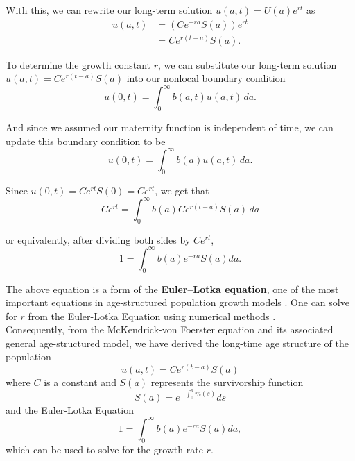 With this, we can rewrite our long-term solution $u(a, t) = U(a)e^{rt}$ as
\begin{align*} u(a, t) &= \left(Ce^{-ra}S(a)\right)e^{rt} \\
&= Ce^{r(t-a)} S(a).\end{align*}

To determine the growth constant $r$, we can substitute our long-term solution $u(a, t) = Ce^{r(t-a)}S(a)$ into our nonlocal boundary condition 
\[ u(0, t) = \int_0^{\infty} b(a, t) u(a, t) \, da.\]

And since we assumed our maternity function is independent of time, we can update this boundary condition to be 
\[ u(0, t) = \int_0^{\infty} b(a) u(a, t) \, da.\]


Since $u(0, t) = Ce^{rt}S(0) = Ce^{rt}$, we get that
\[ Ce^{rt} = \int_0^{\infty} b(a) Ce^{r(t-a)}S(a) \, da\]

or equivalently, after dividing both sides by $Ce^{rt}$,
\[ 1 = \int_0^{\infty} b(a) e^{-ra}S(a) da.\]

The above equation is a form of the \textbf{Euler–Lotka equation}, one of the most important equations in age-structured population growth models \cite{hill}. One can solve for $r$ from the Euler-Lotka Equation using numerical methods \cite{hill}. \\

Consequently, from the McKendrick-von Foerster equation and its associated general age-structured model, we have derived the long-time age structure of the population \[ u(a, t) = Ce^{r(t-a)}S(a) \] where $C$ is a constant and $S(a)$ represents the survivorship function \[  S(a) = e^{-\int_0^a m(s)} ds \]
and the Euler-Lotka Equation
\[ 1 = \int_0^{\infty} b(a) e^{-ra}S(a) da, \]
 which can be used to solve for the growth rate $r$. 
